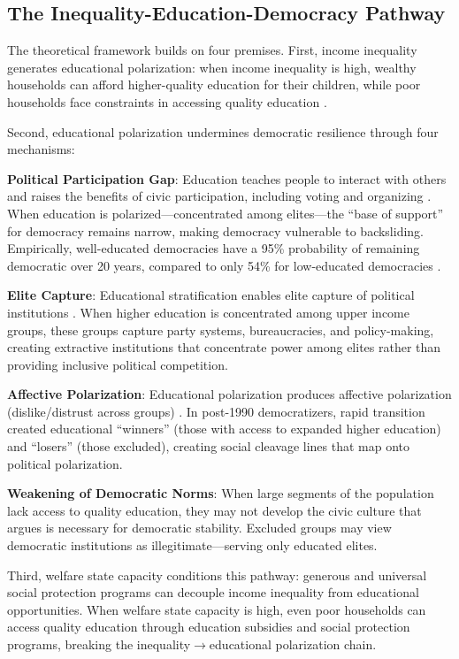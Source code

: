 \documentclass[11pt,letterpaper]{article}
\begin{document}
\subsection{The Inequality-Education-Democracy Pathway}

The theoretical framework builds on four premises. First, income inequality generates educational polarization: when income inequality is high, wealthy households can afford higher-quality education for their children, while poor households face constraints in accessing quality education \citep{Thomas2001}. 

Second, educational polarization undermines democratic resilience through four mechanisms:

\textbf{Political Participation Gap}: Education teaches people to interact with others and raises the benefits of civic participation, including voting and organizing \citep{Glaeser2007}. When education is polarized---concentrated among elites---the ``base of support'' for democracy remains narrow, making democracy vulnerable to backsliding. Empirically, well-educated democracies have a 95\% probability of remaining democratic over 20 years, compared to only 54\% for low-educated democracies \citep{Glaeser2007}.

\textbf{Elite Capture}: Educational stratification enables elite capture of political institutions \citep{Acemoglu2006}. When higher education is concentrated among upper income groups, these groups capture party systems, bureaucracies, and policy-making, creating extractive institutions that concentrate power among elites rather than providing inclusive political competition.

\textbf{Affective Polarization}: Educational polarization produces affective polarization (dislike/distrust across groups) \citep{Boxell2021}. In post-1990 democratizers, rapid transition created educational ``winners'' (those with access to expanded higher education) and ``losers'' (those excluded), creating social cleavage lines that map onto political polarization.

\textbf{Weakening of Democratic Norms}: When large segments of the population lack access to quality education, they may not develop the civic culture that \cite{Dahl1971} argues is necessary for democratic stability. Excluded groups may view democratic institutions as illegitimate---serving only educated elites.

Third, welfare state capacity conditions this pathway: generous and universal social protection programs can decouple income inequality from educational opportunities. When welfare state capacity is high, even poor households can access quality education through education subsidies and social protection programs, breaking the inequality$\rightarrow$educational polarization chain.
\end{document}
